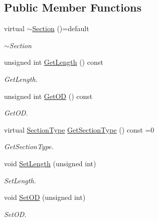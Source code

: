 \subsection*{Public Member Functions}
\begin{DoxyCompactItemize}
\item 
virtual \hyperlink{classdata__model_1_1_section_a55c82d3aed3c42a5fce529234db90d2e}{$\sim$\+Section} ()=default
\begin{DoxyCompactList}\small\item\em $\sim$\+Section \end{DoxyCompactList}\item 
unsigned int \hyperlink{classdata__model_1_1_section_a83603e6c65fb2c9c94db69bffe3b9410}{Get\+Length} () const 
\begin{DoxyCompactList}\small\item\em Get\+Length. \end{DoxyCompactList}\item 
unsigned int \hyperlink{classdata__model_1_1_section_aac5fb205cbeea09302d1aa136967d1eb}{Get\+OD} () const 
\begin{DoxyCompactList}\small\item\em Get\+OD. \end{DoxyCompactList}\item 
virtual \hyperlink{classdata__model_1_1_section_acba8f1759f6c20b81bed2d4a1178a155}{Section\+Type} \hyperlink{classdata__model_1_1_section_a06487a79e538e1849bb1838cf6a0875b}{Get\+Section\+Type} () const =0
\begin{DoxyCompactList}\small\item\em Get\+Section\+Type. \end{DoxyCompactList}\item 
void \hyperlink{classdata__model_1_1_section_aa15a407b629dfe483c31864f7e4b682a}{Set\+Length} (unsigned int)\hypertarget{classdata__model_1_1_section_aa15a407b629dfe483c31864f7e4b682a}{}\label{classdata__model_1_1_section_aa15a407b629dfe483c31864f7e4b682a}

\begin{DoxyCompactList}\small\item\em Set\+Length. \end{DoxyCompactList}\item 
void \hyperlink{classdata__model_1_1_section_a4102c89fa4727b923d31348d33bd935b}{Set\+OD} (unsigned int)\hypertarget{classdata__model_1_1_section_a4102c89fa4727b923d31348d33bd935b}{}\label{classdata__model_1_1_section_a4102c89fa4727b923d31348d33bd935b}

\begin{DoxyCompactList}\small\item\em Set\+OD. \end{DoxyCompactList}\end{DoxyCompactItemize}
